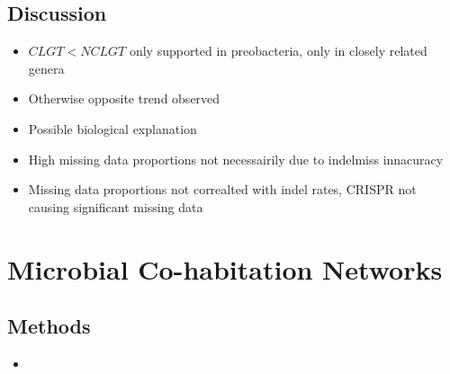 \documentclass[10pt,letter]{article}
\begin{document}
\subsection*{Discussion}
\begin{itemize}
    \item $C LGT < NC LGT$ only supported in preobacteria, only in closely related genera
    \item Otherwise opposite trend observed
    \item  Possible biological explanation
    \item High missing data proportions not necessairily due to indelmiss innacuracy
    \item Missing data proportions not correalted with indel rates, CRISPR not causing significant missing data
\end{itemize}
\section*{Microbial Co-habitation Networks}
\subsection*{Methods}
    \begin{itemize}
        \item
    \end{itemize}
\end{document}
